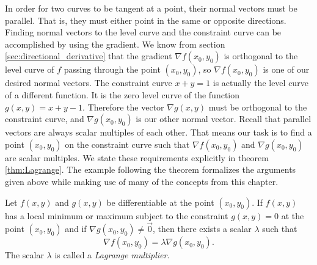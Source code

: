 In order for two curves to be tangent at a point, their normal vectors must be parallel. That is, they must either point in the same or opposite directions. Finding normal vectors to the level curve and the constraint curve can be accomplished by using the gradient. We know from section \ref{sec:directional_derivative} that the gradient $\nabla f(x_0,y_0)$ is orthogonal to the level curve of $f$ passing through the point $(x_0,y_0)$, so $\nabla f(x_0,y_0)$ is one of our desired normal vectors.  The constraint curve $x+y=1$ is actually the level curve of a different function. It is the zero level curve of the function $g(x,y)=x+y-1$. Therefore the vector $\nabla g(x,y)$ must be orthogonal to the constraint curve, and $\nabla g(x_0,y_0)$ is our other normal vector.  Recall that parallel vectors are always scalar multiples of each other. That means our task is to find a point $(x_0,y_0)$ on the constraint curve such that $\nabla f(x_0,y_0)$ and $\nabla g(x_0,y_0)$ are scalar multiples.  We state these requirements explicitly in theorem \ref{thm:Lagrange}.  The example following the theorem formalizes the arguments given above while making use of many of the concepts from this chapter.


{Let $f(x,y)$ and $g(x,y)$ be differentiable at the point $(x_0,y_0)$.  If $f(x,y)$ has a local minimum or maximum subject to the constraint $g(x,y)=0$ at the point $(x_0,y_0)$ and if $\nabla g(x_0,y_0) \neq \vec{0}$, then there exists a scalar $\lambda$ such that
	\[
		\nabla f(x_0,y_0) = \lambda \nabla g(x_0,y_0).
	\]
The scalar $\lambda$ is called a \emph{Lagrange multiplier}. 
}


